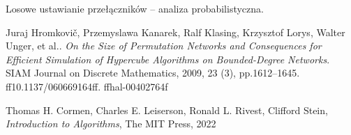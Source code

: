 \documentclass[a4paper]{article}
\theoremstyle{definition}
\begin{document}
Losowe ustawianie przełączników -- analiza probabilistyczna. 


\begin{thebibliography}{9}
Juraj Hromkovič, Przemyslawa Kanarek, Ralf Klasing, Krzysztof Lorys, Walter Unger, et al.. \emph{On the Size of Permutation Networks and Consequences for Efficient Simulation of Hypercube Algorithms on Bounded-Degree Networks}. SIAM Journal on Discrete Mathematics, 2009, 23 (3), pp.1612–1645. ff10.1137/060669164ff. ffhal-00402764f

Thomas H. Cormen, Charles E. Leiserson, Ronald L. Rivest, Clifford Stein, \emph{Introduction to Algorithms}, The MIT Press, 2022
\end{thebibliography}
\end{document}

